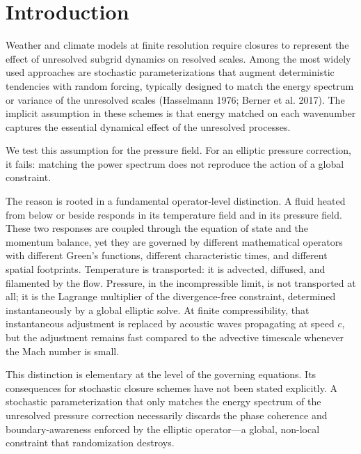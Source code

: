\documentclass[aps,prfluids,preprint,superscriptaddress,nofootinbib]{revtex4-2}
\begin{document}
\maketitle

\section{Introduction}

Weather and climate models at finite resolution require closures to represent the effect of unresolved subgrid dynamics on resolved scales. Among the most widely used approaches are stochastic parameterizations that augment deterministic tendencies with random forcing, typically designed to match the energy spectrum or variance of the unresolved scales (Hasselmann 1976; Berner et al. 2017). The implicit assumption in these schemes is that energy matched on each wavenumber captures the essential dynamical effect of the unresolved processes.

We test this assumption for the pressure field. For an elliptic pressure correction, it fails: matching the power spectrum does not reproduce the action of a global constraint.

The reason is rooted in a fundamental operator-level distinction. A fluid heated from below or beside responds in its temperature field and in its pressure field. These two responses are coupled through the equation of state and the momentum balance, yet they are governed by different mathematical operators with different Green's functions, different characteristic times, and different spatial footprints. Temperature is transported: it is advected, diffused, and filamented by the flow. Pressure, in the incompressible limit, is not transported at all; it is the Lagrange multiplier of the divergence-free constraint, determined instantaneously by a global elliptic solve. At finite compressibility, that instantaneous adjustment is replaced by acoustic waves propagating at speed $c$, but the adjustment remains fast compared to the advective timescale whenever the Mach number is small.

This distinction is elementary at the level of the governing equations. Its consequences for stochastic closure schemes have not been stated explicitly. A stochastic parameterization that only matches the energy spectrum of the unresolved pressure correction necessarily discards the phase coherence and boundary-awareness enforced by the elliptic operator---a global, non-local constraint that randomization destroys.
\end{document}
